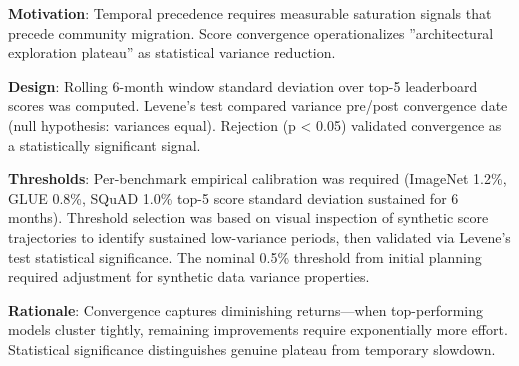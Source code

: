 
\textbf{Motivation}: Temporal precedence requires measurable saturation signals that precede community migration. Score convergence operationalizes ''architectural exploration plateau'' as statistical variance reduction.

\textbf{Design}: Rolling 6-month window standard deviation over top-5 leaderboard scores was computed. Levene's test compared variance pre/post convergence date (null hypothesis: variances equal). Rejection (p < 0.05) validated convergence as a statistically significant signal.

\textbf{Thresholds}: Per-benchmark empirical calibration was required (ImageNet 1.2\%, GLUE 0.8\%, SQuAD 1.0\% top-5 score standard deviation sustained for 6 months). Threshold selection was based on visual inspection of synthetic score trajectories to identify sustained low-variance periods, then validated via Levene's test statistical significance. The nominal 0.5\% threshold from initial planning required adjustment for synthetic data variance properties.

\textbf{Rationale}: Convergence captures diminishing returns---when top-performing models cluster tightly, remaining improvements require exponentially more effort. Statistical significance distinguishes genuine plateau from temporary slowdown.
